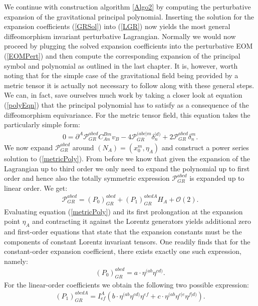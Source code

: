 We continue with construction algorithm \ref{Algo2} by computing the perturbative expansion of the gravitational principal polynomial. Inserting the solution for the expansion coefficients (\ref{GRSol}) into (\ref{LGR}) now yields the most general diffeomorphism invariant perturbative Lagrangian. Normally we would now proceed by plugging the solved expansion coefficients into the perturbative EOM (\ref{EOMPert}) and then compute the corresponding expansion of the principal symbol and polynomial as outlined in the last chapter. It is, however, worth noting that for the simple case of the gravitational field being provided by a metric tensor it is actually not necessary to follow along with these general steps. We can, in fact, save ourselves much work by taking a closer look at equation (\ref{polyEqn}) that the principal polynomial has to satisfy as a consequence of the diffeomorphism equivariance. For the metric tensor field, this equation takes the particularly simple form:
\begin{align}\label{metricPoly}
    0 = \partial^A \mathcal{P}_{GR}^{abcd} C_{An}^{Bm} v_B - 4\mathcal{P}_{GR}^{(abc\vert m} \delta_n^{\vert d)} + 2 \mathcal{P}_{GR}^{abcd} \delta^m_n.
\end{align}
We now expand $\mathcal{P}_{GR}^{abcd}$ around $(N_{A}) = (x_0^m, \eta_A)$ and construct a power series solution to (\ref{metricPoly}). From before we know that given the expansion of the Lagrangian up to third order we only need to expand the polynomial up to first order and hence also the totally symmetric expression $\mathcal{P}_{GR}^{abcd}$ is expanded up to linear order. We get:
\begin{align}
    \mathcal{P}_{GR}^{abcd} = (P_0)_{GR}^{abcd} + (P_1)_{GR}^{abcdA} H_A + \mathcal{O}(2).
\end{align}
Evaluating equation (\ref{metricPoly}) and its first prolongation at the expansion point $\eta_A$ and contracting it against the Lorentz generators yields additional zero and first-order equations that state that the expansion constants must be the components of constant Lorentz invariant tensors. One readily finds that for the constant-order expansion coefficient, there exists exactly one such expression, namely:
\begin{align}
   (P_0)_{GR}^{abcd} = a \cdot \eta^{(ab} \eta^{cd)}. 
\end{align}
For the linear-order coefficients we obtain the following two possible expression:
\begin{align}
    (P_1)_{GR}^{abcdA} = I^A_{ef} \left (b \cdot \eta^{(ab} \eta^{cd)}  \eta^{ef} + c \cdot \eta^{(ab} \eta^{c \vert e} \eta^{f \vert d)} \right ).
\end{align}
